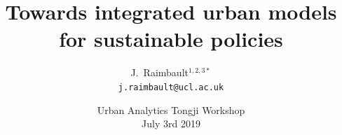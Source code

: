 \documentclass[english,11pt]{beamer}
\newcommand{\sframe}[2]{\frame{\frametitle{#1} #2}}
\begin{document}
\title{Towards integrated urban models for sustainable policies}

\author{J.~Raimbault$^{1,2,3\ast}$\\
\texttt{j.raimbault@ucl.ac.uk}
}




\date{Urban Analytics Tongji Workshop\\
July 3rd 2019
}

\frame{\maketitle}






\end{document}
